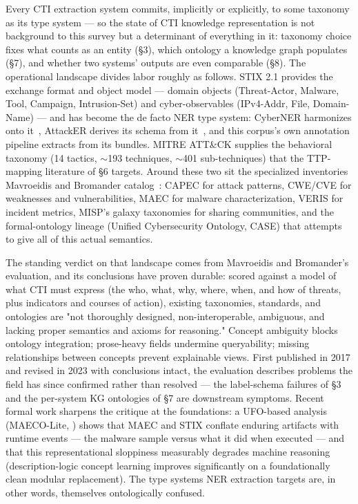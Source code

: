 \documentclass[11pt]{article}
\begin{document}
Every CTI extraction system commits, implicitly or explicitly, to some taxonomy as its type system — so the state of CTI knowledge representation is not background to this survey but a determinant of everything in it: taxonomy choice fixes what counts as an entity (§3), which ontology a knowledge graph populates (§7), and whether two systems' outputs are even comparable (§8). The operational landscape divides labor roughly as follows. STIX 2.1 provides the exchange format and object model — domain objects (Threat-Actor, Malware, Tool, Campaign, Intrusion-Set) and cyber-observables (IPv4-Addr, File, Domain-Name) — and has become the de facto NER type system: CyberNER harmonizes onto it~\citep{echchammakhy2025cyberner}, AttackER derives its schema from it~\citep{deka2024attacker}, and this corpus's own annotation pipeline extracts from its bundles. MITRE ATT\&CK supplies the behavioral taxonomy (14 tactics, $\sim$193 techniques, $\sim$401 sub-techniques) that the TTP-mapping literature of §6 targets. Around these two sit the specialized inventories Mavroeidis and Bromander catalog~\citep{mavroeidis2021cyber}: CAPEC for attack patterns, CWE/CVE for weaknesses and vulnerabilities, MAEC for malware characterization, VERIS for incident metrics, MISP's galaxy taxonomies for sharing communities, and the formal-ontology lineage (Unified Cybersecurity Ontology, CASE) that attempts to give all of this actual semantics.

The standing verdict on that landscape comes from Mavroeidis and Bromander's evaluation, and its conclusions have proven durable: scored against a model of what CTI must express (the who, what, why, where, when, and how of threats, plus indicators and courses of action), existing taxonomies, standards, and ontologies are "not thoroughly designed, non-interoperable, ambiguous, and lacking proper semantics and axioms for reasoning." Concept ambiguity blocks ontology integration; prose-heavy fields undermine queryability; missing relationships between concepts prevent explainable views. First published in 2017 and revised in 2023 with conclusions intact, the evaluation describes problems the field has since confirmed rather than resolved — the label-schema failures of §3 and the per-system KG ontologies of §7 are downstream symptoms. Recent formal work sharpens the critique at the foundations: a UFO-based analysis (MAECO-Lite, \citealp{adams2026maecolite}) shows that MAEC and STIX conflate enduring artifacts with runtime events — the malware sample versus what it did when executed — and that this representational sloppiness measurably degrades machine reasoning (description-logic concept learning improves significantly on a foundationally clean modular replacement). The type systems NER extraction targets are, in other words, themselves ontologically confused.
\end{document}

